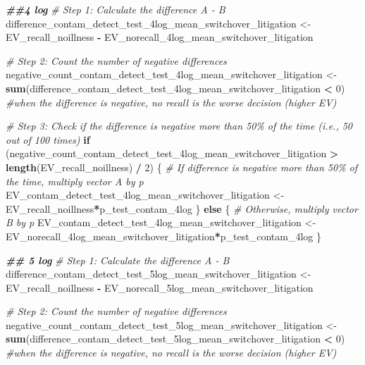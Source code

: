 \documentclass[
]{article}
\newenvironment{Shaded}{\begin{snugshade}}{\end{snugshade}}
\newcommand{\CommentTok}[1]{\textcolor[rgb]{0.56,0.35,0.01}{\textit{#1}}}
\newcommand{\ControlFlowTok}[1]{\textcolor[rgb]{0.13,0.29,0.53}{\textbf{#1}}}
\newcommand{\DecValTok}[1]{\textcolor[rgb]{0.00,0.00,0.81}{#1}}
\newcommand{\DocumentationTok}[1]{\textcolor[rgb]{0.56,0.35,0.01}{\textbf{\textit{#1}}}}
\newcommand{\FunctionTok}[1]{\textcolor[rgb]{0.13,0.29,0.53}{\textbf{#1}}}
\newcommand{\NormalTok}[1]{#1}
\newcommand{\OtherTok}[1]{\textcolor[rgb]{0.56,0.35,0.01}{#1}}
\newcommand{\SpecialCharTok}[1]{\textcolor[rgb]{0.81,0.36,0.00}{\textbf{#1}}}
\begin{document}
\begin{Shaded}
\begin{Highlighting}[]
\DocumentationTok{\#\#4 log}
\CommentTok{\# Step 1: Calculate the difference A {-} B}
\NormalTok{difference\_contam\_detect\_test\_4log\_mean\_switchover\_litigation }\OtherTok{\textless{}{-}}\NormalTok{ EV\_recall\_noillness }\SpecialCharTok{{-}}\NormalTok{ EV\_norecall\_4log\_mean\_switchover\_litigation}

\CommentTok{\# Step 2: Count the number of negative differences}
\NormalTok{negative\_count\_contam\_detect\_test\_4log\_mean\_switchover\_litigation }\OtherTok{\textless{}{-}} \FunctionTok{sum}\NormalTok{(difference\_contam\_detect\_test\_4log\_mean\_switchover\_litigation }\SpecialCharTok{\textless{}} \DecValTok{0}\NormalTok{) }\CommentTok{\#when the difference is negative, no recall is the worse decision (higher EV)}

\CommentTok{\# Step 3: Check if the difference is negative more than 50\% of the time (i.e., 50 out of 100 times)}
\ControlFlowTok{if}\NormalTok{ (negative\_count\_contam\_detect\_test\_4log\_mean\_switchover\_litigation }\SpecialCharTok{\textgreater{}} \FunctionTok{length}\NormalTok{(EV\_recall\_noillness) }\SpecialCharTok{/} \DecValTok{2}\NormalTok{) \{}
  \CommentTok{\# If difference is negative more than 50\% of the time, multiply vector A by p}
\NormalTok{  EV\_contam\_detect\_test\_4log\_mean\_switchover\_litigation }\OtherTok{\textless{}{-}}\NormalTok{ EV\_recall\_noillness}\SpecialCharTok{*}\NormalTok{p\_test\_contam\_4log}
\NormalTok{\} }\ControlFlowTok{else}\NormalTok{ \{}
  \CommentTok{\# Otherwise, multiply vector B by p}
\NormalTok{ EV\_contam\_detect\_test\_4log\_mean\_switchover\_litigation  }\OtherTok{\textless{}{-}}\NormalTok{ EV\_norecall\_4log\_mean\_switchover\_litigation}\SpecialCharTok{*}\NormalTok{p\_test\_contam\_4log}
\NormalTok{\}}


\DocumentationTok{\#\# 5 log}
\CommentTok{\# Step 1: Calculate the difference A {-} B}
\NormalTok{difference\_contam\_detect\_test\_5log\_mean\_switchover\_litigation }\OtherTok{\textless{}{-}}\NormalTok{ EV\_recall\_noillness }\SpecialCharTok{{-}}\NormalTok{ EV\_norecall\_5log\_mean\_switchover\_litigation}

\CommentTok{\# Step 2: Count the number of negative differences}
\NormalTok{negative\_count\_contam\_detect\_test\_5log\_mean\_switchover\_litigation }\OtherTok{\textless{}{-}} \FunctionTok{sum}\NormalTok{(difference\_contam\_detect\_test\_5log\_mean\_switchover\_litigation }\SpecialCharTok{\textless{}} \DecValTok{0}\NormalTok{) }\CommentTok{\#when the difference is negative, no recall is the worse decision (higher EV)}


\end{Highlighting}
\end{Shaded}
\end{document}
